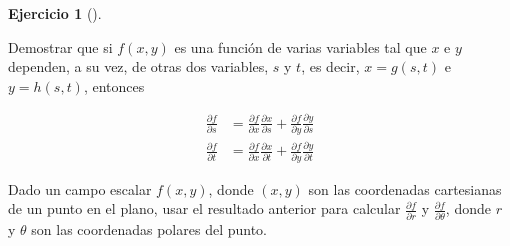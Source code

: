 \documentclass[
  spanish,
  a4paper,
]{scrreport}
\theoremstyle{definition}
\newtheorem{exercise}{Ejercicio}[chapter]
\theoremstyle{remark}
\begin{document}
\begin{exercise}[]\protect\hypertarget{exr-regla-cadena-coordenadas-polares}{}\label{exr-regla-cadena-coordenadas-polares}

Demostrar que si \(f(x,y)\) es una función de varias variables tal que
\(x\) e \(y\) dependen, a su vez, de otras dos variables, \(s\) y \(t\),
es decir, \(x=g(s,t)\) e \(y=h(s,t)\), entonces

\begin{align*}
\frac{\partial f}{\partial s} 
&= \frac{\partial f}{\partial x} \frac{\partial x}{\partial s} + \frac{\partial f}{\partial y} \frac{\partial y}{\partial s} \\
\frac{\partial f}{\partial t} 
&= \frac{\partial f}{\partial x} \frac{\partial x}{\partial t} + \frac{\partial f}{\partial y} \frac{\partial y}{\partial t} 
\end{align*}

Dado un campo escalar \(f(x,y)\), donde \((x,y)\) son las coordenadas
cartesianas de un punto en el plano, usar el resultado anterior para
calcular \(\frac{\partial f}{\partial r}\) y
\(\frac{\partial f}{\partial \theta}\), donde \(r\) y \(\theta\) son las
coordenadas polares del punto.

\end{exercise}
\end{document}
